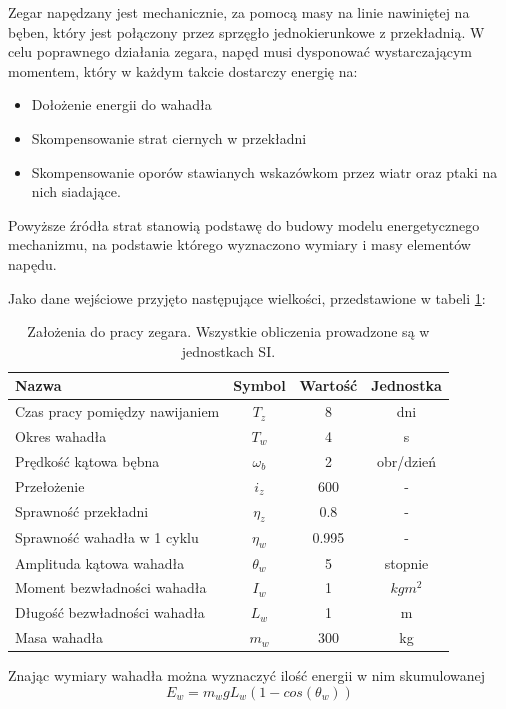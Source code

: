 Zegar napędzany jest mechanicznie, za pomocą masy na linie nawiniętej na bęben, który jest połączony przez sprzęgło jednokierunkowe z przekładnią. W celu poprawnego działania zegara, napęd musi dysponować wystarczającym momentem, który w każdym takcie dostarczy energię na:

\begin{itemize}
\item Dołożenie energii do wahadła
\item Skompensowanie strat ciernych w przekładni
\item Skompensowanie oporów stawianych wskazówkom przez wiatr oraz ptaki na nich siadające.
\end{itemize}

Powyższe źródła strat stanowią podstawę do budowy modelu energetycznego mechanizmu, na podstawie którego wyznaczono wymiary i masy elementów napędu.

Jako dane wejściowe przyjęto następujące wielkości, przedstawione w tabeli \ref{tab:bebn_zal}:

\begin{table}[h]
\centering
\begin{tabular}{l|c|c|c}
Nazwa & Symbol & Wartość & Jednostka \\ \hline \hline
Czas pracy pomiędzy nawijaniem& \(T_z\) & 8 & dni \\
Okres wahadła & \(T_w\) & 4 & s \\
Prędkość kątowa bębna & \(\omega_b\) & 2 & obr/dzień\\
Przełożenie & \(i_z\) &  600  & - \\
Sprawność przekładni & \(\eta_z\) & 0.8 & - \\
Sprawność wahadła w 1 cyklu & \(\eta_w\) & 0.995 & -\\
Amplituda kątowa wahadła & \(\theta_w\) & 5 & stopnie \\
Moment bezwładności wahadła & \(I_w\) & 1 & \(kg m^2\) \\
Długość bezwładności wahadła & \(L_w\) & 1 & m \\
Masa wahadła & \(m_w\) & 300 & kg \\
\hline
\end{tabular}
\caption{Założenia do pracy zegara. Wszystkie obliczenia prowadzone są w jednostkach SI.}
\label{tab:bebn_zal}
\end{table}


Znając wymiary wahadła można wyznaczyć ilość energii w nim skumulowanej
\begin{equation}
E_w = m_w g  L_w (1-cos(\theta_w))
\end{equation}

